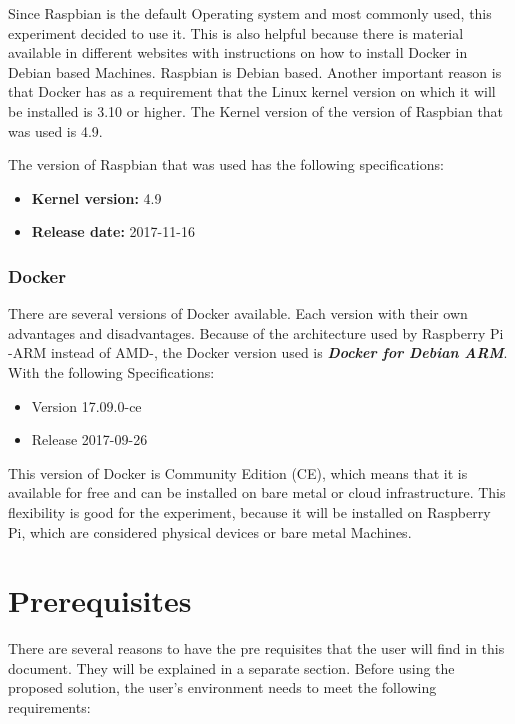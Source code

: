 \documentclass[sigconf]{acmart}
\begin{document}
	Since Raspbian is the default Operating system and most commonly used, this experiment decided to use it. This is also helpful because there is material available in different websites with instructions on how to install Docker in Debian based Machines. Raspbian is Debian based.
	Another important reason is that Docker has as a requirement that the Linux kernel version on which it will be installed is 3.10 or higher. The Kernel version of the version of Raspbian that was used is 4.9.
	
	The version of Raspbian that was used has the following specifications:
	
	\begin{itemize}
	\item 	\textbf{Kernel version:} 4.9
	\item 	\textbf{Release date:} 2017-11-16
	\end{itemize}
	
	\subsubsection{Docker}

	There are several versions of Docker available. Each version with their own advantages and disadvantages. Because of the architecture used by Raspberry Pi -ARM instead of AMD-, the Docker version used is 	\textbf{\textit{Docker for Debian ARM}}. With the following Specifications:
	
	\begin{itemize}
	\item Version 17.09.0-ce
	\item Release 2017-09-26
	\end{itemize}
	
	This version of Docker is Community Edition (CE), which means that it is available for free and can be installed on bare metal or cloud infrastructure. This flexibility is good for the experiment, because it will be installed on Raspberry Pi, which are considered physical devices or bare metal Machines.
	\cite{dockerdoc2017}
	
	\section{Prerequisites}
	
	There are several reasons to have the pre requisites that the user will find in this document. They will be explained in a separate section. Before using the proposed solution, the user’s environment needs to meet the following requirements:
	
\end{document}
